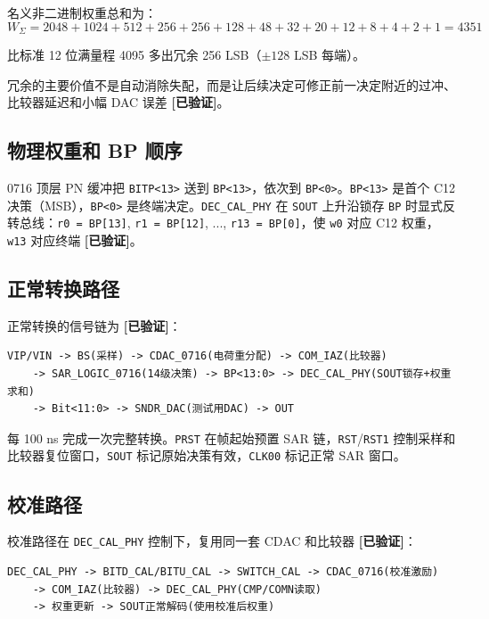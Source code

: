 \documentclass[UTF8,a4paper,11pt]{ctexart}
\newcommand{\verified}{\textcolor{verifiedgreen}{\textbf{[已验证]}}}
\begin{document}
名义非二进制权重总和为：
\begin{equation}
W_\Sigma = 2048 + 1024 + 512 + 256 + 256 + 128 + 48 + 32 + 20 + 12 + 8 + 4 + 2 + 1 = 4351
\label{eq:wsum}
\end{equation}

比标准 12 位满量程 4095 多出冗余 256 LSB（$\pm 128$ LSB 每端）。

冗余的主要价值不是自动消除失配，而是让后续决定可修正前一决定附近的过冲、比较器延迟和小幅 DAC 误差 \verified。

\subsection{物理权重和 BP 顺序}

0716 顶层 PN 缓冲把 \texttt{BITP<13>} 送到 \texttt{BP<13>}，依次到 \texttt{BP<0>}。\texttt{BP<13>} 是首个 C12 决策（MSB），\texttt{BP<0>} 是终端决定。\texttt{DEC\_CAL\_PHY} 在 \texttt{SOUT} 上升沿锁存 \texttt{BP} 时显式反转总线：\texttt{r0 = BP[13]}, \texttt{r1 = BP[12]}, ..., \texttt{r13 = BP[0]}，使 \texttt{w0} 对应 C12 权重，\texttt{w13} 对应终端 \verified。

\subsection{正常转换路径}

正常转换的信号链为 \verified：

\begin{lstlisting}[style=textstyle]
VIP/VIN -> BS(采样) -> CDAC_0716(电荷重分配) -> COM_IAZ(比较器)
    -> SAR_LOGIC_0716(14级决策) -> BP<13:0> -> DEC_CAL_PHY(SOUT锁存+权重求和)
    -> Bit<11:0> -> SNDR_DAC(测试用DAC) -> OUT
\end{lstlisting}

每 100 ns 完成一次完整转换。\texttt{PRST} 在帧起始预置 SAR 链，\texttt{RST}/\texttt{RST1} 控制采样和比较器复位窗口，\texttt{SOUT} 标记原始决策有效，\texttt{CLK00} 标记正常 SAR 窗口。

\subsection{校准路径}

校准路径在 \texttt{DEC\_CAL\_PHY} 控制下，复用同一套 CDAC 和比较器 \verified：

\begin{lstlisting}[style=textstyle]
DEC_CAL_PHY -> BITD_CAL/BITU_CAL -> SWITCH_CAL -> CDAC_0716(校准激励)
    -> COM_IAZ(比较器) -> DEC_CAL_PHY(CMP/COMN读取)
    -> 权重更新 -> SOUT正常解码(使用校准后权重)
\end{lstlisting}
\end{document}
